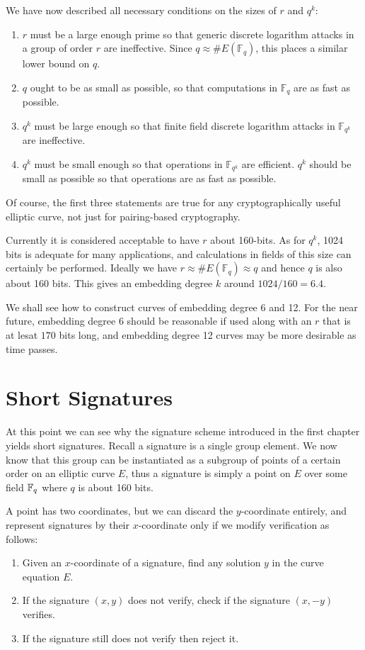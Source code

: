 We have now described all necessary conditions on the sizes of
$r$ and $q^k$:

\begin{enumerate}
\item
$r$ must be a large enough prime so that generic discrete logarithm attacks
in a group of order $r$ are ineffective. Since $q \approx \#E(\mathbb{F}_q)$,
this places a similar lower bound on $q$.
\item
$q$ ought to be as small as possible, so that computations in $\mathbb{F}_q$
are as fast as possible.
\item
$q^k$ must be large enough so that finite field discrete logarithm attacks
in $\mathbb{F}_{q^k}$ are ineffective.
\item
$q^k$ must be small enough so that operations in $\mathbb{F}_{q^k}$
are efficient. $q^k$ should be small as possible so that operations
are as fast as possible.
\end{enumerate}

Of course, the first three statements are true for any cryptographically
useful elliptic curve, not just for pairing-based cryptography.

Currently it is considered acceptable to have $r$ about 160-bits.
As for $q^k$, 1024 bits is adequate for many applications, and calculations
in fields of this size can certainly be performed.
Ideally we have $r \approx \#E(\mathbb{F}_q) \approx q$
and hence $q$ is also about 160 bits. This gives an
embedding degree $k$ around $1024 / 160 = 6.4$.

We shall see how to construct curves of embedding degree 6 and 12.
For the near future, embedding degree 6 should be reasonable if used along
with an $r$ that is at lesat $170$ bits long,
and embedding degree 12 curves may be more desirable as time passes.

\section {Short Signatures}

At this point we can see why the signature scheme introduced
in the first chapter
yields short signatures. Recall a signature is a single group element.
We now know that this group can be instantiated as a subgroup of points
of a certain order on an elliptic curve $E$, thus a signature is simply
a point on $E$ over some field $\mathbb{F}_q$ where $q$ is about 160 bits.

A point has two coordinates, but we can discard the $y$-coordinate entirely,
and represent signatures by their $x$-coordinate only if we modify
verification as follows:
\begin{enumerate}
\item
Given an $x$-coordinate of a signature, find any solution $y$
in the curve equation $E$.
\item
If the signature $(x,y)$ does not verify,
check if the signature $(x, -y)$ verifies.
\item
If the signature still does not verify then reject it.
\end{enumerate}

